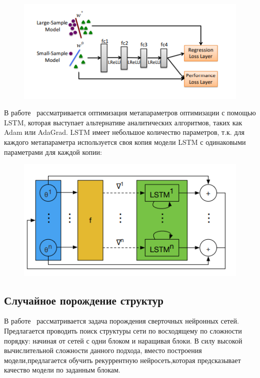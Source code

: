 \begin{figure}[H]
\includegraphics[width=\textwidth]{./plots/arch_review_figs/l2l_scheme.png}
\end{figure}

В работе~\cite{l2l_by_gd_gd} рассматривается оптимизация метапараметров оптимизации с помощью LSTM, которая выступает альтернативе аналитических алгоритмов, таких как Adam или AdaGrad. LSTM имеет небольшое количество параметров, т.к. для каждого метапараметра используется своя копия модели LSTM с одинаковыми параметрами для каждой копии:
\begin{figure}[H]
\includegraphics[width=\textwidth]{./plots/arch_review_figs/l2lbygd.png}
\end{figure}




\subsection*{Случайное порождение структур}
В работе~\cite{search_smbo} рассматривается задача порождения сверточных нейронных сетей. Предлагается проводить поиск структуры сети по восходящему по сложности порядку: начиная от сетей с одни блоком и наращивая блоки. В силу высокой вычислительной сложности данного подхода, вместо построения модели,предлагается обучить рекуррентную нейросеть,которая предсказывает качество модели по заданным блокам. 


